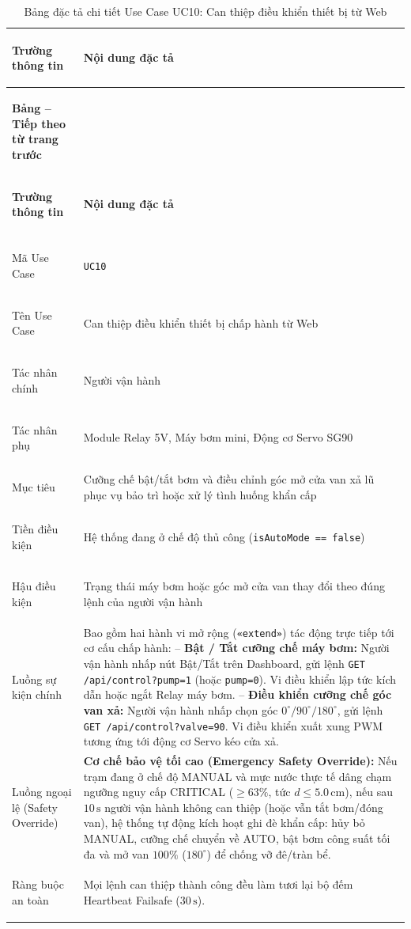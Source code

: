 \begin{xltabular}{\textwidth}{|>{\bfseries\raggedright\arraybackslash}p{3.2cm}|X|}
\caption{Bảng đặc tả chi tiết Use Case UC10: Can thiệp điều khiển thiết bị từ Web} \label{tab:spec_uc10} \\
\hline
\textbf{Trường thông tin} & \textbf{Nội dung đặc tả} \\ \hline
\endfirsthead

{{\bfseries Bảng \thetable{} -- Tiếp theo từ trang trước}} \\
\hline
\textbf{Trường thông tin} & \textbf{Nội dung đặc tả} \\ \hline
\endhead

\hline {} \\ \hline
\endfoot

\hline
\endlastfoot
Mã Use Case & \texttt{UC10} \\ \hline
Tên Use Case & Can thiệp điều khiển thiết bị chấp hành từ Web \\ \hline
Tác nhân chính & Người vận hành \\ \hline
Tác nhân phụ & Module Relay 5V, Máy bơm mini, Động cơ Servo SG90 \\ \hline
Mục tiêu & Cưỡng chế bật/tắt bơm và điều chỉnh góc mở cửa van xả lũ phục vụ bảo trì hoặc xử lý tình huống khẩn cấp \\ \hline
Tiền điều kiện & Hệ thống đang ở chế độ thủ công (\texttt{isAutoMode == false}) \\ \hline
Hậu điều kiện & Trạng thái máy bơm hoặc góc mở cửa van thay đổi theo đúng lệnh của người vận hành \\ \hline
Luồng sự kiện chính & 
Bao gồm hai hành vi mở rộng (\texttt{«extend»}) tác động trực tiếp tới cơ cấu chấp hành: \newline
-- \textbf{Bật / Tắt cưỡng chế máy bơm:} Người vận hành nhấp nút Bật/Tắt trên Dashboard, gửi lệnh \texttt{GET /api/control?pump=1} (hoặc \texttt{pump=0}). Vi điều khiển lập tức kích dẫn hoặc ngắt Relay máy bơm. \newline
-- \textbf{Điều khiển cưỡng chế góc van xả:} Người vận hành nhấp chọn góc $0^\circ / 90^\circ / 180^\circ$, gửi lệnh \texttt{GET /api/control?valve=90}. Vi điều khiển xuất xung PWM tương ứng tới động cơ Servo kéo cửa xả. \\ \hline
Luồng ngoại lệ (Safety Override) & 
\textbf{Cơ chế bảo vệ tối cao (Emergency Safety Override):} \newline
Nếu trạm đang ở chế độ MANUAL và mực nước thực tế dâng chạm ngưỡng nguy cấp CRITICAL ($\ge 63\%$, tức $d \le 5.0\,\text{cm}$), nếu sau $10\,\text{s}$ người vận hành không can thiệp (hoặc vẫn tắt bơm/đóng van), hệ thống tự động kích hoạt ghi đè khẩn cấp: hủy bỏ MANUAL, cưỡng chế chuyển về AUTO, bật bơm công suất tối đa và mở van $100\%$ ($180^\circ$) để chống vỡ đê/tràn bể. \\ \hline
Ràng buộc an toàn & Mọi lệnh can thiệp thành công đều làm tươi lại bộ đếm Heartbeat Failsafe ($30\,\text{s}$). \\ \hline

\end{xltabular}
\endgroup

